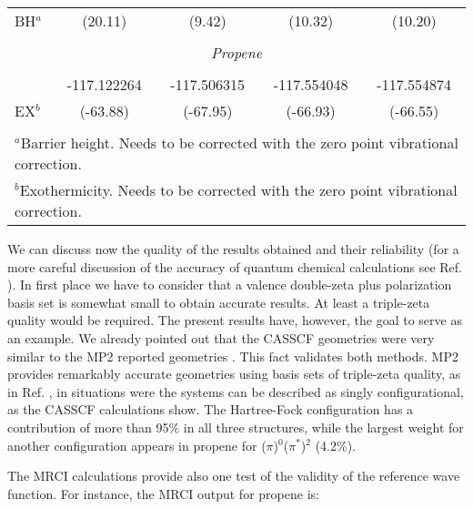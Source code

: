 \begin{table}[p]
\begin{center}
\begin{tabular}{lcccc}
BH$^a$  & (20.11)     & (9.42)      & (10.32)     & (10.20)      \\
\\
\multicolumn{5}{c}{\it Propene} \\
\\
        & -117.122264 & -117.506315 & -117.554048 & -117.554874  \\
EX$^b$  & (-63.88)    & (-67.95)    & (-66.93)    & (-66.55)     \\ 
\\\hline\hline
\multicolumn{5}{l}{\footnotesize{$^a$Barrier height. Needs to be corrected with the zero point vibrational correction.}}\\
\multicolumn{5}{l}{\footnotesize{$^b$Exothermicity. Needs to be corrected with the zero point vibrational correction.}}\\
\end{tabular}
\end{center}
\end{table}

We can discuss now the quality of the results obtained and their
reliability (for a more careful discussion of the accuracy of
quantum chemical calculations see Ref. \cite{Taylor:92b}).
In first place we have to consider that a valence
double-zeta plus polarization basis set is somewhat small to obtain
accurate results. At least a triple-zeta quality would be required.
The present results have, however, the goal to serve as an example.
We already pointed out that the CASSCF geometries were very similar
to the MP2 reported geometries \cite{Ford:97}. This fact validates
both methods. MP2 provides remarkably accurate geometries using
basis sets of triple-zeta quality, as in Ref. \cite{Ford:97}, in
situations were the systems can be described as singly configurational,
as the CASSCF calculations show. The Hartree-Fock configuration has
a contribution of more than 95\% in all three structures, while the
largest weight for another configuration appears in propene for
($\pi$)$^0$($\pi^*$)$^2$ (4.2\%). 


The MRCI calculations provide also one test of the validity of the
reference wave function. For instance, the MRCI output for propene is:

